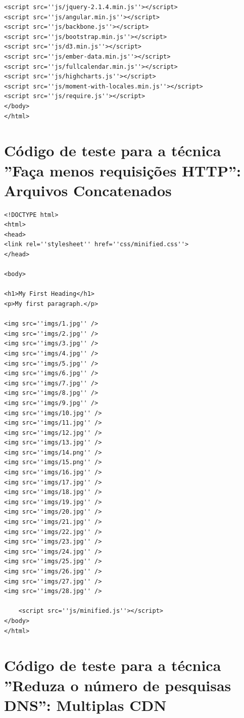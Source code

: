 \begin{apendicesenv}
\begin{lstlisting}
<script src=''js/jquery-2.1.4.min.js''></script>
<script src=''js/angular.min.js''></script>
<script src=''js/backbone.js''></script>
<script src=''js/bootstrap.min.js''></script>
<script src=''js/d3.min.js''></script>
<script src=''js/ember-data.min.js''></script>
<script src=''js/fullcalendar.min.js''></script>
<script src=''js/highcharts.js''></script>
<script src=''js/moment-with-locales.min.js''></script>
<script src=''js/require.js''></script>
</body>
</html>
\end{lstlisting}

\chapter{Código de teste para a técnica ''Faça menos requisições HTTP'': Arquivos Concatenados}
\label{apend:codigo_facamenosrequisicoeshttp_concat}

\begin{lstlisting}
<!DOCTYPE html>
<html>
<head>
<link rel=''stylesheet'' href=''css/minified.css''>
</head>

<body>

<h1>My First Heading</h1>
<p>My first paragraph.</p>
	
<img src=''imgs/1.jpg'' />
<img src=''imgs/2.jpg'' />
<img src=''imgs/3.jpg'' />
<img src=''imgs/4.jpg'' />
<img src=''imgs/5.jpg'' />
<img src=''imgs/6.jpg'' />
<img src=''imgs/7.jpg'' />
<img src=''imgs/8.jpg'' />
<img src=''imgs/9.jpg'' />
<img src=''imgs/10.jpg'' />
<img src=''imgs/11.jpg'' />
<img src=''imgs/12.jpg'' />
<img src=''imgs/13.jpg'' />
<img src=''imgs/14.png'' />
<img src=''imgs/15.png'' />
<img src=''imgs/16.jpg'' />
<img src=''imgs/17.jpg'' />
<img src=''imgs/18.jpg'' />
<img src=''imgs/19.jpg'' />
<img src=''imgs/20.jpg'' />
<img src=''imgs/21.jpg'' />
<img src=''imgs/22.jpg'' />
<img src=''imgs/23.jpg'' />
<img src=''imgs/24.jpg'' />
<img src=''imgs/25.jpg'' />
<img src=''imgs/26.jpg'' />
<img src=''imgs/27.jpg'' />
<img src=''imgs/28.jpg'' />

	<script src=''js/minified.js''></script>
</body>
</html>

\end{lstlisting}

\chapter{Código de teste para a técnica ''Reduza o número de pesquisas DNS'': Multiplas CDN}
\label{apend:codigo_reduzaonumerodepesquisasdns_mult}	


\end{apendicesenv}
